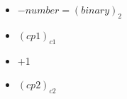 \begin{itemize}
\item $-{{ number }} = ( {{ binary }} )_{2}$
\item $( {{ cp1 }} )_{c1}$
\item +1
\item $( {{ cp2 }} )_{c2}$
\end{itemize}
